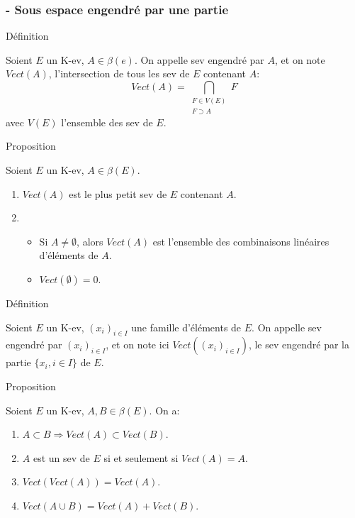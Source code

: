 \documentclass[10pt,a4paper]{beamer}
\newcounter{Def}
\newcounter{Pro}
\newcounter{Sec}
\newcounter{Sub}[Sec]
\begin{document}
\addtocounter{Sec}{1}
\setcounter{Sub}{1}

\begin{frame}
\frametitle{ - Sous espace engendré par une partie}

\begin{block}{Définition \theDef}
\addtocounter{Def}{1}
Soient $E$ un K-ev, $A\in\beta(e)$. On appelle sev engendré par $A$, et on note $Vect(A)$, l'intersection de tous les sev de $E$ contenant $A$: \[ Vect(A) = \bigcap_{\substack{F\in V(E)\\F\supset A}}F \] avec $V(E)$ l'ensemble des sev de $E$.
\end{block}

\begin{block}{Proposition \thePro}
\addtocounter{Pro}{1}
Soient $E$ un K-ev, $A\in\beta(E)$.\begin{enumerate}
\item $Vect(A)$ est le plus petit sev de $E$ contenant $A$.
\item \begin{itemize}
\item Si $A\neq \emptyset$, alors $Vect(A)$ est l'ensemble des combinaisons linéaires d'éléments de $A$.
\item$Vect(\emptyset)=0$.
\end{itemize}
\end{enumerate}
\end{block}
\end{frame}

\begin{frame}
\begin{block}{Définition \theDef}
\addtocounter{Def}{1}
Soient $E$ un K-ev, $(x_i)_{i\in I}$ une famille d'éléments de $E$. On appelle sev engendré par $(x_i)_{i\in I}$, et on note ici $Vect((x_i)_{i\in I})$, le sev engendré par la partie $\lbrace x_i, i\in I\rbrace$ de $E$.
\end{block}

\begin{block}{Proposition \thePro}
\addtocounter{Pro}{1}
Soient $E$ un K-ev, $A,B\in\beta(E)$. On a:\begin{enumerate}
\item $A\subset B\Rightarrow Vect(A)\subset Vect(B)$.
\item $A$ est un sev de $E$ si et seulement si $Vect(A)=A$.
\item $Vect(Vect(A))=Vect(A)$.
\item $Vect(A\cup B) = Vect(A)+Vect(B)$.
\end{enumerate}
\end{block}
\end{frame}
\end{document}
